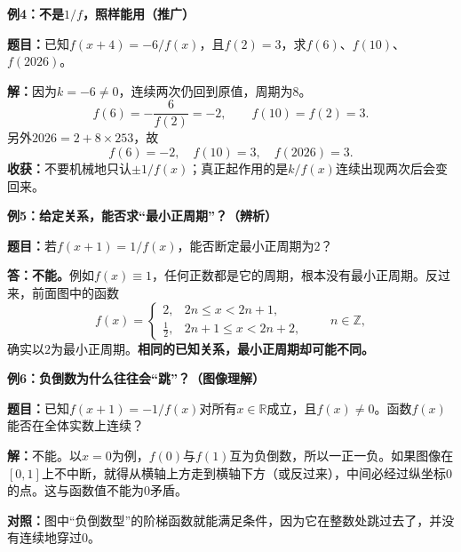 \clearpage
\begin{examplebox}
\textbf{\textcolor{CExample}{例4：不是$1/f$，照样能用（推广）}}



\textbf{题目：}已知$f(x+4)=-6/f(x)$，且$f(2)=3$，求$f(6)$、$f(10)$、$f(2026)$。

\textbf{解：}因为$k=-6\ne0$，连续两次仍回到原值，周期为$8$。
\[
 f(6)=-\frac6{f(2)}=-2,
 \qquad f(10)=f(2)=3.
\]
另外$2026=2+8\times253$，故
\[
 \boxed{f(6)=-2,\quad f(10)=3,\quad f(2026)=3}.
\]
\textbf{收获：}不要机械地只认$\pm1/f(x)$；真正起作用的是$k/f(x)$连续出现两次后会变回来。

\medskip

\end{examplebox}
\clearpage
\begin{examplebox}
\textbf{\textcolor{CExample}{例5：给定关系，能否求“最小正周期”？（辨析）}}



\textbf{题目：}若$f(x+1)=1/f(x)$，能否断定最小正周期为$2$？

\textbf{答：不能。}例如$f(x)\equiv1$，任何正数都是它的周期，根本没有最小正周期。反过来，前面图中的函数
\[
 f(x)=\begin{cases}
 2,&2n\le x<2n+1,\\[2pt]
 \frac12,&2n+1\le x<2n+2,
 \end{cases}\qquad n\in\mathbb Z,
\]
确实以$2$为最小正周期。\textbf{相同的已知关系，最小正周期却可能不同。}

\medskip

\end{examplebox}
\clearpage
\begin{examplebox}
\textbf{\textcolor{CExample}{例6：负倒数为什么往往会“跳”？（图像理解）}}



\textbf{题目：}已知$f(x+1)=-1/f(x)$对所有$x\in\mathbb R$成立，且$f(x)\ne0$。函数$f(x)$能否在全体实数上连续？

\textbf{解：}不能。以$x=0$为例，$f(0)$与$f(1)$互为负倒数，所以一正一负。如果图像在$[0,1]$上不中断，就得从横轴上方走到横轴下方（或反过来），中间必经过纵坐标$0$的点。这与函数值不能为$0$矛盾。

\textbf{对照：}图中“负倒数型”的阶梯函数就能满足条件，因为它在整数处跳过去了，并没有连续地穿过$0$。
\end{examplebox}
